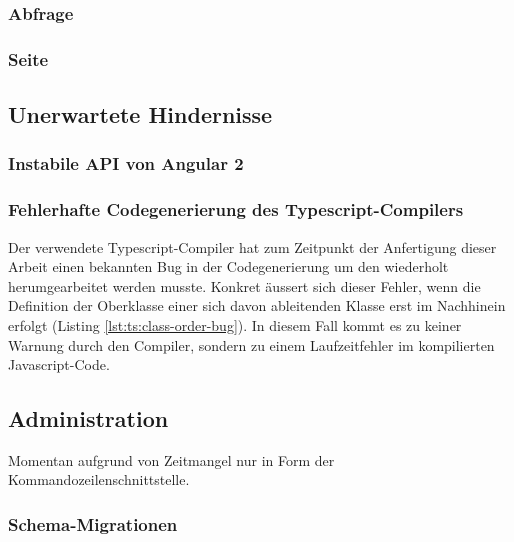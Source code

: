 \subsubsection{Abfrage}
\label{sec:data-model-query}

\subsubsection{Seite}

\subsection{Unerwartete Hindernisse}

\subsubsection{Instabile API von Angular 2}

\subsubsection{Fehlerhafte Codegenerierung des Typescript-Compilers}

Der verwendete Typescript-Compiler hat zum Zeitpunkt der Anfertigung dieser Arbeit einen bekannten Bug in der Codegenerierung \cite{ts-compiler-class-order-bug} um den wiederholt herumgearbeitet werden musste. Konkret äussert sich dieser Fehler, wenn die Definition der Oberklasse einer sich davon ableitenden Klasse erst im Nachhinein erfolgt (Listing \ref{lst:ts:class-order-bug}). In diesem Fall kommt es zu keiner Warnung durch den Compiler, sondern zu einem Laufzeitfehler im kompilierten Javascript-Code.



\subsection{Administration}
\label{sec:implementation-administration}

Momentan aufgrund von Zeitmangel nur in Form der Kommandozeilenschnittstelle.

\subsubsection{Schema-Migrationen}
\label{sec:implementation-migration}

